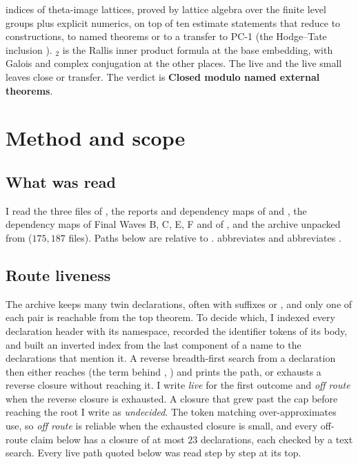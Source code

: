 \documentclass[11pt]{article}
\newcommand{\PC}[1]{\textsf{PC-#1}}
\newcommand{\sE}{\textbf{Closed modulo named external theorems}}
\theoremstyle{remark}
\begin{document}
indices of theta-image lattices, proved by lattice algebra over the finite level groups plus explicit numerics, on top of ten estimate statements that reduce to constructions, to named theorems or to a transfer to \PC{1} (the Hodge--Tate inclusion ). $_2$ is the Rallis inner product formula at the base embedding, with Galois and complex conjugation at the other places. The live  and the live small leaves close or transfer. The verdict is \sE.

\tableofcontents

\section{Method and scope}

\subsection{What was read}

I read the three files of , the reports and dependency maps of  and , the dependency maps of Final Waves B, C, E, F and of , and the archive  unpacked from  ($175{,}187$ files). Paths below are relative to .  abbreviates  and  abbreviates .

\subsection{Route liveness}

The archive keeps many twin declarations, often with suffixes  or , and only one of each pair is reachable from the top theorem. To decide which, I indexed every declaration header with its namespace, recorded the identifier tokens of its body, and built an inverted index from the last component of a name to the declarations that mention it. A reverse breadth-first search from a declaration then either reaches  (the term behind , ) and prints the path, or exhausts a reverse closure without reaching it. I write \emph{live} for the first outcome and \emph{off route} when the reverse closure is exhausted. A closure that grew past the cap before reaching the root I write as \emph{undecided}. The token matching over-approximates use, so \emph{off route} is reliable when the exhausted closure is small, and every off-route claim below has a closure of at most $23$ declarations, each checked by a text search. Every live path quoted below was read step by step at its top.
\end{document}
